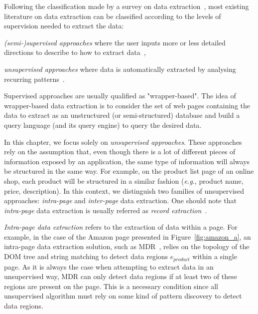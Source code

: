 Following the classification made by a survey on data extraction~\cite{Chang2006ASystems}, most existing literature on data extraction can be classified according to the levels of supervision needed to extract the data:
\begin{compactitem}
    \item \emph{(semi-)supervised approaches} where the user inputs more or less detailed directions to describe to how to extract data~\cite{Barish2000TheaterLoc:Applications,Huang2000ExtractingWEB,Levy1996QueryingDescriptions,Muslea1999ExtractionSurvey,Gottlob2004Logic-basedExtraction,Gottlob2004MonadicExtraction,Hsu1998GeneratingWeb},
    \item \emph{unsupervised approaches} where data is automatically extracted by analysing recurring patterns~\cite{Crescenzi2001RoadRunner:Sites,ArasuExtractingPages,Liu2003MiningPages,Wang2002WrapperDiscovery,Wang2002WrapperDiscovery}.
\end{compactitem}

Supervised approaches are usually qualified as "wrapper-based".
The idea of wrapper-based data extraction is to consider the set of web pages containing the data to extract as an unstructured (or semi-structured) database and build a query language (and its query engine) to query the desired data.

In this chapter, we focus solely on \emph{unsupervised approaches}.
These approaches rely on the assumption that, even though there is a lot of different pieces of information exposed by an application, the same type of information will always be structured in the same way.
For example, on the product list page of an online shop, each product will be structured in a similar fashion (\emph{e.g.}, product name, price, description).
In this context, we distinguish two families of unsupervised approaches: \emph{intra-page} and \emph{inter-page} data extraction.
One should note that \emph{intra-page} data extraction is usually referred as \emph{record extraction}~\cite{Chang2006ASystems,DeReis2004AutomaticDistance}. 

\emph{Intra-page data extraction} refers to the extraction of data within a page.
For example, in the case of the Amazon page presented in Figure~\ref{fig:amazon_a}, an intra-page data extraction solution, such as MDR~\cite{Liu2003MiningPages}, relies on the topology of the DOM tree and string matching to detect data regions $\hat{e}_{product}$ within a single page.
As it is always the case when attempting to extract data in an unsupervised way, MDR can only detect data regions if at least two of these regions are present on the page.
This is a necessary condition since all unsupervised algorithm must rely on some kind of pattern discovery to detect data regions.

